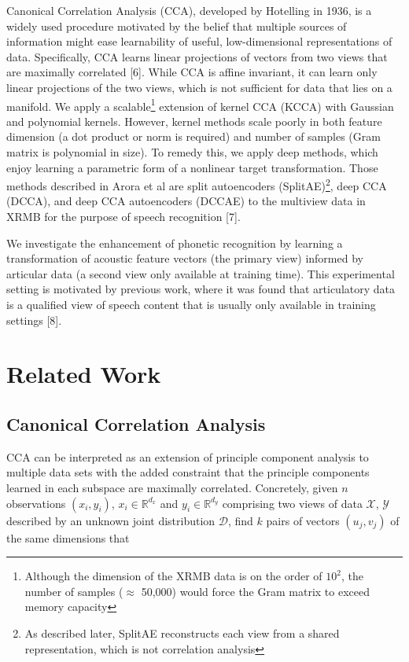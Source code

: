\documentclass{article} %
\begin{document}
Canonical Correlation Analysis (CCA), developed by Hotelling in 1936, is a widely used procedure motivated by the belief that multiple sources of information might ease learnability of useful, low-dimensional representations of data. Specifically, CCA learns linear projections of vectors from two views that are maximally correlated [6]. While CCA is affine invariant, it can learn only linear projections of the two views, which is not sufficient for data that lies on a manifold. We apply a scalable\footnote{Although the dimension of the XRMB data is on the order of $10^2$, the number of samples ($\approx$ 50,000) would force the Gram matrix to exceed memory capacity} extension of kernel CCA (KCCA) with Gaussian and polynomial kernels. However, kernel methods scale poorly in both feature dimension (a dot product or norm is required) and number of samples (Gram matrix is polynomial in size). To remedy this, we apply deep methods, which enjoy learning a parametric form of a nonlinear target transformation. Those methods described in Arora et al are split autoencoders (SplitAE)\footnote{As described later, SplitAE reconstructs each view from a shared representation, which is not correlation analysis}, deep CCA (DCCA), and deep CCA autoencoders (DCCAE) to the multiview data in XRMB for the purpose of speech recognition [7].

We investigate the enhancement of phonetic recognition by learning a transformation of acoustic feature vectors (the primary view) informed by articular data (a second view only available at training time). This experimental setting is motivated by previous work, where it was found that articulatory data is a qualified view of speech content that is usually only available in training settings [8].



\section{Related Work}
\subsection{Canonical Correlation Analysis}
CCA can be interpreted as an extension of principle component analysis to multiple data sets with the added constraint that the principle components learned in each subspace are maximally correlated. Concretely, given $n$ observations $(x_i, y_i)$,  $x_i \in \mathbb{R}^{d_x}$ and $y_i \in \mathbb{R}^{d_y}$ comprising two views of data $\mathcal{X}$, $\mathcal{Y}$ described by an unknown joint distribution $\mathcal{D}$, find $k$ pairs of vectors $(u_j, v_j)$ of the same dimensions that 
\end{document}
